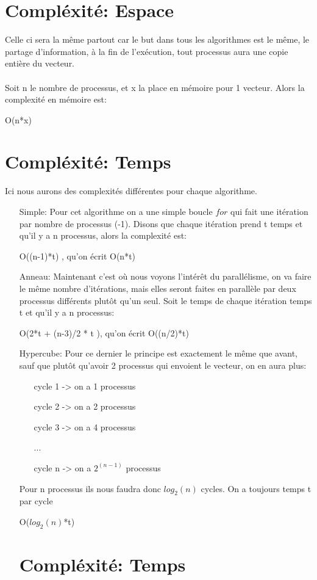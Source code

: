 \documentclass[a4paper]{article}
\begin{document}
\section*{Compléxité: Espace}
Celle ci sera la même partout car le but dans tous les algorithmes est le même, le partage d'information, à la fin de l'exécution, tout processus aura une copie entière du vecteur.\\\\
Soit n le nombre de processus, et x la place en mémoire pour 1 vecteur. Alors la complexité en mémoire est:
\begin{center}
O(n*x) 
\end{center}

\section*{Compléxité: Temps}
Ici nous aurons des complexités différentes pour chaque algorithme.\\
\begin{itemize}
\item[Simple:] Pour cet algorithme on a une simple boucle $for$ qui fait une itération par nombre de processus (-1). Disons que chaque itération prend t temps et qu'il y a n processus, alors la complexité est:  
\begin{center}
O((n-1)*t) , qu'on écrit O(n*t)
\end{center}


\item[Anneau:] Maintenant c'est où nous voyons l'intérêt du parallélisme, on va faire le même nombre d'itérations, mais elles seront faites en parallèle par deux processus différents plutôt qu'un seul. Soit le temps de chaque itération temps t et qu'il y a n processus:  
\begin{center}
O(2*t + (n-3)/2 * t ), qu'on écrit O((n/2)*t) 
\end{center}

\item[Hypercube:] Pour ce dernier le principe est exactement le même que avant, sauf que plutôt qu'avoir 2 processus qui envoient le vecteur, on en aura plus:

\begin{itemize} 
\item[cycle 1 -> ] on a 1 processus
\item[cycle 2 -> ] on a 2 processus
\item[cycle 3 -> ] on a 4 processus
\item[ ... ]
\item[cycle n -> ] on a $2^{(n-1)}$ processus 
\end{itemize} 

Pour n processus ils nous faudra donc $log_{2}(n)$ cycles. On a toujours temps t par cycle
\begin{center}
O($log_{2}(n)$*t) 
\end{center}

\section*{Compléxité: Temps}
\end{itemize}
\end{document}
